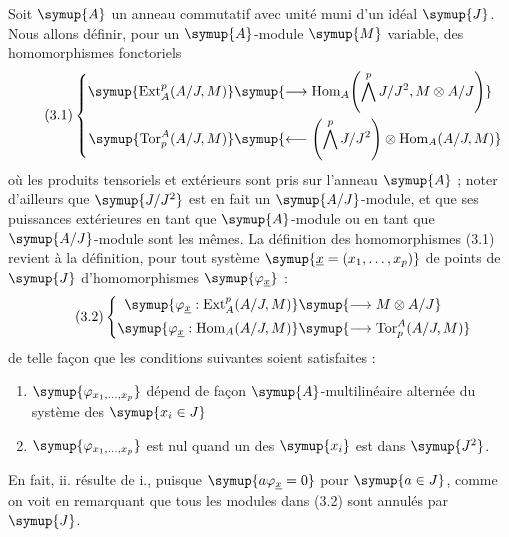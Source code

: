 Soit $\symup{A}$ un anneau commutatif avec unité muni d'un idéal $\symup{J}$. Nous allons
définir, pour un $\symup{A}$-module $\symup{M}$ variable, des homomorphismes fonctoriels
\begin{equation}\tag{3.1}
\left\{
\begin{aligned}\symup{\operatorname{Ext}_{A}^{p}(A/J,M)}&\symup{\longrightarrow
  \operatorname{Hom}_{A}\!\left(\bigwedge^{p}J/J^{2},M\otimes A/J\right)}\\\symup{\operatorname{Tor}_{p}^{A}(A/J,M)}&\symup{\longleftarrow
  \left(\bigwedge^{p}J/J^{2}\right)
  \otimes\operatorname{Hom}_{A}(A/J,M)}\end{aligned}
\right.
\end{equation}
où les produits tensoriels et extérieurs sont pris sur l'anneau $\symup{A}$ ; noter
d'ailleurs que $\symup{J/J^{2}}$ est en fait un $\symup{A/J}$-module, et que ses puissances
extérieures en tant que $\symup{A}$-module ou en tant que $\symup{A/J}$-module sont les mêmes.
La définition des homomorphismes (3.1) revient à la définition, pour tout
système $\symup{\underline{x}=(x_1,\ldots,x_p)}$ de points de $\symup{J}$ d'homomorphismes
$\symup{\varphi_{\underline{x}}}$ :
\begin{equation}\tag{3.2}
\left\{
\begin{aligned}\symup{\varphi_{\underline{x}}:
  \operatorname{Ext}_{A}^{p}(A/J,M)}&\symup{\longrightarrow M\otimes A/J}\\\symup{\varphi_{\underline{x}}:
  \operatorname{Hom}_{A}(A/J,M)}&\symup{\longrightarrow
  \operatorname{Tor}_{p}^{A}(A/J,M)}\end{aligned}
\right.
\end{equation}
de telle façon que les conditions suivantes soient satisfaites :

\begin{enumerate}
\item[\textup{i.}] $\symup{\varphi_{x_1,\ldots,x_p}}$ dépend de façon
$\symup{A}$-multilinéaire alternée du système des $\symup{x_i\in J}$
\item[\textup{ii.}] $\symup{\varphi_{x_1,\ldots,x_p}}$ est nul quand un des $\symup{x_i}$ est
dans $\symup{J^{2}}$.
\end{enumerate}
En fait, ii. résulte de i., puisque $\symup{a\varphi_{\underline{x}}=0}$ pour $\symup{a\in J}$,
comme on voit en remarquant que tous les modules dans (3.2) sont annulés par
$\symup{J}$.


